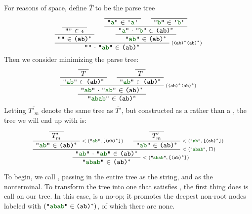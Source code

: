     For reasons of space, define $\overline{T}$ to be the parse tree
    \[
      \AxiomC{} \UnaryInfC{\str{} $\in$ $\epsilon$}
      \UnaryInfC{\str{} $\in$ \regex{(ab)$^*$}}
      \AxiomC{}\UnaryInfC{\str{a} $\in$ \terminal{a}}
      \AxiomC{}\UnaryInfC{\str{b} $\in$ \terminal{b}}
      \BinaryInfC{\llstrcat{\str{a}}{\str{b}} $\in$ \regex{(ab)$^*$}}
      \UnaryInfC{\str{ab} $\in$ \regex{(ab)$^*$}}
      \RightLabel{\scriptsize(\regex{(ab)$^*$(ab)$^*$})}
      \BinaryInfC{\llstrcat{\str{}}{\str{ab}} $\in$ \regex{(ab)$^*$}}
    \DisplayProof
    \]
    Then we consider minimizing the parse tree:
    \[
      \AxiomC{}
      \UnaryInfC{$T$}
      \UnaryInfC{\str{ab} $\in$ \regex{(ab)$^*$}}
      \AxiomC{}
      \UnaryInfC{$T$}
      \UnaryInfC{\str{ab} $\in$ \regex{(ab)$^*$}}
      \RightLabel{\scriptsize(\regex{(ab)$^*$(ab)$^*$})}
      \BinaryInfC{\llstrcat{\str{ab}}{\str{ab}} $\in$ \regex{(ab)$^*$}}
      \UnaryInfC{\str{abab} $\in$ \regex{(ab)$^*$}}
    \DisplayProof
    \]
    Letting $\overline{T'_m}$ denote the same tree as $\overline{T'}$, but constructed as a  rather than a ,
    the tree we will end up with is:
    \[
      \AxiomC{}\UnaryInfC{$T'_m$}
      \RightLabel{\scriptsize\minparsetreeannot{\str{ab}}{\valuelist{\regex{(ab)$^*$}}}}
      \UnaryInfC{\str{ab} $\in$ \regex{(ab)$^*$}}
      \AxiomC{}\UnaryInfC{$T'_m$}
      \RightLabel{\scriptsize\minparsetreeannot{\str{ab}}{\valuelist{\regex{(ab)$^*$}}}}
      \UnaryInfC{\str{ab} $\in$ \regex{(ab)$^*$}}
      \RightLabel{\scriptsize\minparsetreeannot{\str{abab}}{\nil}}
      \BinaryInfC{\llstrcat{\str{ab}}{\str{ab}} $\in$ \regex{(ab)$^*$}}
      \RightLabel{\scriptsize\minparsetreeannot{\str{abab}}{\valuelist{\regex{(ab)$^*$}}}}
      \UnaryInfC{\str{abab} $\in$ \regex{(ab)$^*$}}
    \DisplayProof
    \]

    To begin, we call , passing in the entire tree as the string, and  as the nonterminal.  To transform the tree into one that satisfies , the first thing  does is call  on our tree.  In this case,  is a no-op; it promotes the deepest non-root nodes labeled with $(\str{abab}\in\regex{(ab)$^*$})$, of which there are none.

